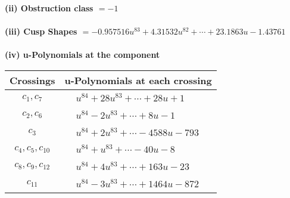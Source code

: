 \documentclass[1p]{elsarticle_modified}
\theoremstyle{definition}
\begin{document}
\flushleft \textbf{(ii) Obstruction class $= -1$}\\~\\
\flushleft \textbf{(iii) Cusp Shapes $= -0.957516 u^{83}+4.31532 u^{82}+\cdots+23.1863 u-1.43761$}\\~\\
\newpage\renewcommand{\arraystretch}{1}
\flushleft \textbf{(iv) u-Polynomials at the component}\newline \\
\begin{tabular}{m{50pt}|m{274pt}}
Crossings & \hspace{64pt}u-Polynomials at each crossing \\
\hline $$\begin{aligned}c_{1},c_{7}\end{aligned}$$&$\begin{aligned}
&u^{84}+28 u^{83}+\cdots+28 u+1
\end{aligned}$\\
\hline $$\begin{aligned}c_{2},c_{6}\end{aligned}$$&$\begin{aligned}
&u^{84}-2 u^{83}+\cdots+8 u-1
\end{aligned}$\\
\hline $$\begin{aligned}c_{3}\end{aligned}$$&$\begin{aligned}
&u^{84}+2 u^{83}+\cdots-4588 u-793
\end{aligned}$\\
\hline $$\begin{aligned}c_{4},c_{5},c_{10}\end{aligned}$$&$\begin{aligned}
&u^{84}+u^{83}+\cdots-40 u-8
\end{aligned}$\\
\hline $$\begin{aligned}c_{8},c_{9},c_{12}\end{aligned}$$&$\begin{aligned}
&u^{84}+4 u^{83}+\cdots+163 u-23
\end{aligned}$\\
\hline $$\begin{aligned}c_{11}\end{aligned}$$&$\begin{aligned}
&u^{84}-3 u^{83}+\cdots+1464 u-872
\end{aligned}$\\
\hline
\end{tabular}\\~\\
\end{document}
